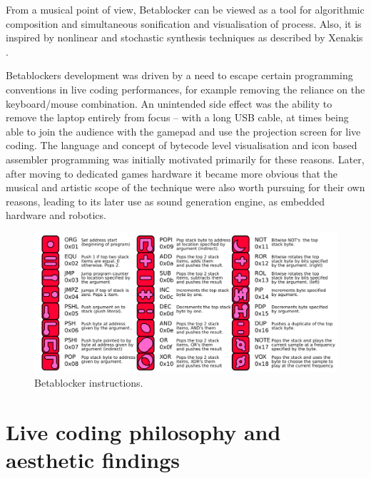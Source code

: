 \documentclass[letterpaper, 12pt]{article}
\begin{document}
From a musical point of view, Betablocker can be viewed as a tool for algorithmic composition \citep*{maurer1999-a-b} and simultaneous sonification and visualisation of process. Also, it is inspired by nonlinear and stochastic synthesis techniques as described by Xenakis \citep*{Xenakis:1971, luque2009-the}.

Betablockers development was driven by a need to escape certain programming conventions in live coding performances, for example removing the reliance on the keyboard/mouse combination. An unintended side effect was the ability to remove the laptop entirely from focus -- with a long USB cable, at times being able to join the audience with the gamepad and use the projection screen for live coding. The language and concept of bytecode level visualisation and icon based assembler programming was initially motivated primarily for these reasons. Later, after moving to dedicated games hardware it became more obvious that the musical and artistic scope of the technique were also worth pursuing for their own reasons, leading to its later use as sound generation engine, as embedded hardware and robotics.

\begin{figure}
	\centering
		\includegraphics[width=13cm]{bbds-legend}
	\caption{Betablocker instructions.}
	\label{fig:fig_bbds-legend}
\end{figure}
\parskip 18pt


\section{Live coding philosophy and aesthetic findings}
\label{sec:distinct_character}

\end{document}
